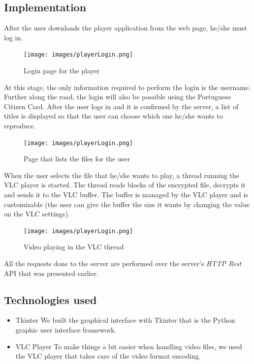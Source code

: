 \documentclass[11pt,a4paper]{report}
\begin{document}
\subsection{Implementation}
After the user downloads the player application from the web page, he/she must log in. 

\begin{figure}[H]
\centerline{\texttt{[image: images/playerLogin.png]}}
\caption{Login page for the player}
\label{player}
\end{figure}

At this stage, the only information required to perform the login is the username. Further along the road, the login will also be possible using the Portuguese Citizen Card.
\newline After the user logs in and it is confirmed by the server, a list of titles is displayed so that the user can choose which one he/she wants to reproduce.

\begin{figure}[H]
\centerline{\texttt{[image: images/playerLogin.png]}}
\caption{Page that lists the files for the user}
\label{player}
\end{figure}

When the user selects the file that he/she wants to play, a thread running the VLC player is started. The thread reads blocks of the encrypted file, decrypts it and sends it to the VLC buffer.
\newline
The buffer is managed by the VLC player and is customizable (the user can give the buffer the size it wants by changing the value on the VLC settings).

\begin{figure}[H]
\centerline{\texttt{[image: images/playerLogin.png]}}
\caption{Video playing in the VLC thread}
\label{player}
\end{figure}


All the requests done to the server are performed over the server's \emph{HTTP Rest} API that was presented earlier.

\subsection{Technologies used}
\begin{itemize}
  \item{Tkinter} We built the graphical interface with Tkinter that is the Python graphic user interface framework.
  \item{VLC Player} To make things a bit easier when handling video files, we used the VLC player that takes care of the video format encoding.
\end{itemize}
\end{document}

